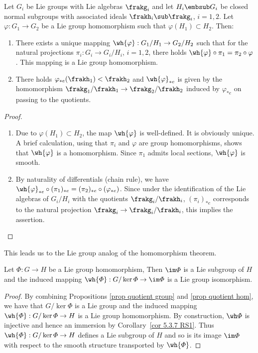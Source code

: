 \begin{prop}\label{prop quotient hom}
    Let $G_i$ be Lie groups with Lie algebras $\frakg_i$ and let $H_i\embsub G_i$ be closed normal subgroups with associated ideals $\frakh_i\sub \frakg_i$, $i=1,2$. Let $\varphi:G_1\to G_2$ be a Lie group homomorphism such that $\varphi(H_1)\subset H_2$. Then:
    \begin{enumerate}
        \item There exists a unique mapping $\wh{\varphi}:G_1\slash H_1\to G_2\slash H_2$ such that for the natural projections $\pi_i:G_i\to G_i\slash H_i$, $i=1,2$, there holds $\wh{\varphi}\circ\pi_1=\pi_2\circ \varphi$. This mapping is a Lie group homomorphism.
        \item There holds $\varphi_{\ast e}(\frakh_1)<\frakh_2$ and $\wh{\varphi}_{\ast e}$ is given by the homomorphism $\frakg_1\slash\frakh_1\to \frakg_2\slash\frakh_2$ induced by $\varphi_{\ast e}$ on passing to the quotients.
    \end{enumerate}
\end{prop}
\begin{proof}
    \begin{enumerate}
        \item Due to $\varphi(H_1)\subset H_2$, the map $\wh{\varphi}$ is well-defined. It is obviously unique. A brief calculation, using that $\pi_i$ and $\varphi$ are group homomorphisms, shows that $\wh{\varphi}$ is a homomorphism. Since $\pi_1$ admits local sections, $\wh{\varphi}$ is smooth.
        \item By naturality of differentials (chain rule), we have $\wh{\varphi}_{\ast e}\circ (\pi_1)_{\ast e}=(\pi_2)_{\ast e}\circ (\varphi_{\ast e})$. Since under the identification of the Lie algebras of $G_i\slash H_i$ with the quotients $\frakg_i\slash \frakh_i$, $(\pi_i)_{\ast e}$ corresponds to the natural projection $\frakg_i\to \frakg_i\slash \frakh_i$, this implies the assertion.
    \end{enumerate}
\end{proof}

This leads us to the Lie group analog of the homomorphism theorem.

\begin{prop}
    Let $\varPhi:G\to H$ be a Lie group homomorphism, Then $\im\varPhi$ is a Lie subgroup of $H$ and the induced mapping $\wh{\varPhi}:G\slash \ker \varPhi\to \im\varPhi$ is a Lie group isomorphism.
\end{prop}
\begin{proof}
    By combining Propositions \ref{prop quotient group} and \ref{prop quotient hom}, we have that $G\slash \ker\varPhi$  is a Lie group and the induced mapping $\wh{\varPhi}:G\slash\ker\varPhi\to H$ is a Lie group homomorphism. By construction, $\wh\varPhi$ is injective and hence an immersion by Corollary~\ref{cor 5.3.7 RS1}. Thus $\wh{\varPhi}:G\slash \ker\varPhi\to H$ defines a Lie subgroup of $H$ and so is its image $\im\varPhi$ with  respect to the smooth structure transported by $\wh{\varPhi}$.
\end{proof}

